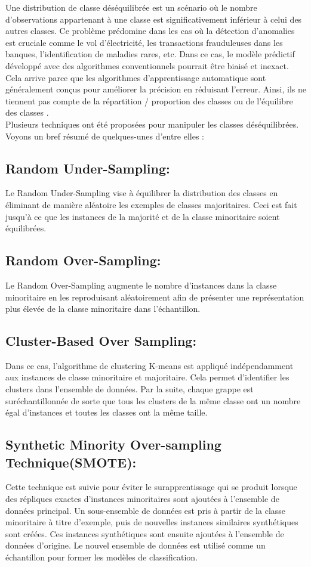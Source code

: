 \documentclass[12pt, french]{report}
\begin{document}
Une distribution de classe déséquilibrée est un scénario où le nombre d'observations appartenant à une classe est significativement inférieur à celui des autres classes. 
Ce problème prédomine dans les cas où la détection d'anomalies est cruciale comme le vol d'électricité, les transactions frauduleuses dans les banques, l'identification de maladies rares, etc. Dans ce cas, le modèle prédictif développé avec des algorithmes conventionnels pourrait être biaisé et inexact.\\
Cela arrive parce que les algorithmes d'apprentissage automatique sont généralement conçus pour améliorer la précision en réduisant l'erreur. Ainsi, ils ne tiennent pas compte de la répartition / proportion des classes ou de l'équilibre des classes \cite{key19}.\\

Plusieurs techniques ont été proposées pour manipuler les classes déséquilibrées. Voyons un bref résumé de quelques-unes d'entre elles  \cite{key19}:
\subsection{Random Under-Sampling:}
Le Random Under-Sampling vise à équilibrer la distribution des classes en éliminant de manière aléatoire les exemples de classes majoritaires. Ceci est fait jusqu'à ce que les instances de la majorité et de la classe minoritaire soient équilibrées.
\subsection{Random Over-Sampling:}
Le Random Over-Sampling augmente le nombre d'instances dans la classe minoritaire en les reproduisant aléatoirement afin de présenter une représentation plus élevée de la classe minoritaire dans l'échantillon.
\subsection{Cluster-Based Over Sampling:}
Dans ce cas, l'algorithme de clustering K-means est appliqué indépendamment aux instances de classe minoritaire et majoritaire. Cela permet d'identifier les clusters dans l'ensemble de données. Par la suite, chaque grappe est suréchantillonnée de sorte que tous les clusters de la même classe ont un nombre égal d'instances et toutes les classes ont la même taille.
\subsection{Synthetic Minority Over-sampling Technique(SMOTE):}
Cette technique est suivie pour éviter le surapprentissage qui se produit lorsque des répliques exactes d'instances minoritaires sont ajoutées à l'ensemble de données principal. Un sous-ensemble de données est pris à partir de la classe minoritaire à titre d'exemple, puis de nouvelles instances similaires synthétiques sont créées. Ces instances synthétiques sont ensuite ajoutées à l'ensemble de données d'origine. Le nouvel ensemble de données est utilisé comme un échantillon pour former les modèles de classification.
\end{document}
